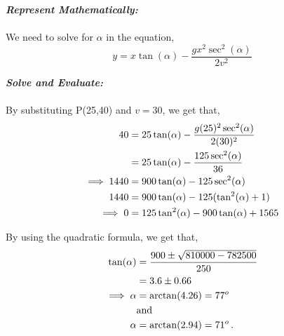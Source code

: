 \begin{subquestions}
\textbf{\textit{Represent Mathematically:}} \\ \\
We need to solve for $\alpha$ in the equation,
\begin{equation}
	y = x\tan(\alpha) - \frac{gx^2\sec^2(\alpha)}{2v^2}
\end{equation} 
    
    
    
    
\textbf{\textit{Solve and Evaluate:}} \\ \\
By substituting P(25,40) and $v=30$, we get that,
\begin{align}
	40 & = 25\tan(\alpha) - \frac{g(25)^2\sec^2(\alpha)}{2(30)^2} \nonumber \\
	 & = 25\tan(\alpha) - \frac{125\sec^2(\alpha)}{36} \nonumber \\
	 \implies 1440 & = 900\tan(\alpha) -125\sec^2(\alpha) \nonumber \\
	 1440 & = 900\tan(\alpha) -125(\tan^2(\alpha)+1) \nonumber \\
	 \implies 0 & = 125\tan^2(\alpha)-900\tan(\alpha) + 1565  \nonumber \\ 
\end{align}
  
By using the quadratic formula, we get that,
\begin{align}
	\tan(\alpha) & = \frac{900 \pm \sqrt{810000-782500}}{250} \nonumber \\
	             & = 3.6 \pm 0.66 \nonumber \\
	             \implies \alpha & = \arctan(4.26) = 77^o \nonumber \\
	             & \text{and} \nonumber \\
	             \alpha & = \arctan(2.94) = 71^o \,.
\end{align}


















	
\end{subquestions}